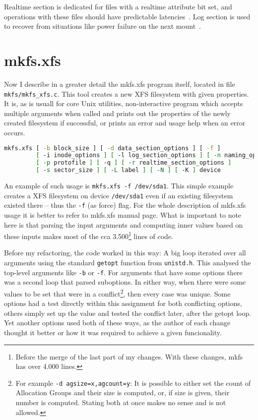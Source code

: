 Realtime section is dedicated for files with a realtime attribute bit set, and operations with these files should have predictable latencies~\cite{xfsRealtime}. Log section is used to recover from situations like power failure on the next mount~\cite{xfsStructure,xfsman}.


\section{mkfs.xfs}
Now I describe in a greater detail the mkfs.xfs program itself, located in file {\tt mkfs/mkfs\_xfs.c}. This tool creates a new XFS filesystem with given properties. It is, as is usuall for core Unix utilities, non-interactive program which accepts multiple arguments when called and prints out the properties of the newly created filesystem if successful, or prints an error and usage help when an error occurs.

\begin{lstlisting}[frame=none, basicstyle=\footnotesize\ttfamily, language=Bash, numbers=none, numberstyle=\tiny\color{black},caption= {Synopsis of mkfs.xfs utility~\cite{mkfs.xfsMan}.}]
mkfs.xfs [ -b block_size ] [ -d data_section_options ] [ -f ]
         [ -i inode_options ] [ -l log_section_options ] [ -n naming_options ]
         [ -p protofile ] [ -q ] [ -r realtime_section_options ]
         [ -s sector_size ] [ -L label ] [ -N ] [ -K ] device
\end{lstlisting}

An example of such usage is {\tt mkfs.xfs -f /dev/sda1}. This simple example creates a XFS filesystem on device {\tt /dev/sda1} even if an existing filesystem existed there -- thus the {\tt -f} (as force) flag. For the whole description of mkfs.xfs usage it is better to refer to mkfs.xfs manual page. What is important to note here is that parsing the input arguments and computing inner values based on these inputs makes most of the cca 3.500\footnote{Before the merge of the last part of my changes. With these changes, mkfs has over 4.000 lines.} lines of code.

Before my refactoring, the code worked in this way: A big loop iterated over all arguments using the standard {\tt getopt} function from {\tt unistd.h}. This analysed the top-level arguments like {\tt -b} or {\tt -f}. For arguments that have some options there was a second loop that parsed suboptions. In either way, when there were some values to be set that were in a conflict\footnote{For example {\tt -d agsize=x,agcount=y}: It is possible to either set the count of Allocation Groups and their size is computed, or, if size is given, their number is computed. Stating both at once makes no sense and is not allowed.}, then every case was unique. Some options had a test directly within this assignment for both conflicting options, others simply set up the value and tested the conflict later, after the getopt loop. Yet another options used both of these ways, as the author of each change thought it better or how it was required to achieve a given funcionality.

